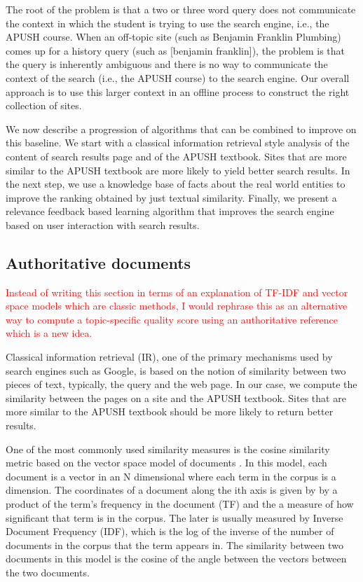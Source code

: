 \documentclass{acm_proc_article-sp}
\begin{document}
The root of the problem is that a two or three word query does not communicate
the context in which the student is trying to use the search engine, i.e., the
APUSH course.  When an off-topic site (such as Benjamin Franklin Plumbing) comes
up for a history query (such as [benjamin franklin]), the problem is that the
query is inherently ambiguous and there is no way to communicate the context of
the search (i.e., the APUSH course) to the search engine.  Our overall approach
is to use this larger context in an offline process to construct the right
collection of sites. 

We now describe a progression of algorithms that can be combined to improve on
this baseline. We start with a classical information retrieval style analysis of
the content of search results page and of the APUSH textbook. Sites that are
more similar to the APUSH textbook are more likely to yield better search
results. In the next step, we use a knowledge base of facts about the real world
entities to improve the ranking obtained by just textual similarity. Finally, we
present a relevance feedback based learning algorithm that improves the search
engine based on user interaction with search results. 

\subsection{Authoritative documents}

\textcolor{red}{Instead of writing this section in terms of an explanation of
  TF-IDF and vector space models which are classic methods, I would rephrase this
  as an alternative way to compute a topic-specific quality score using an
  authoritative reference which is a new idea.}

Classical information retrieval (IR), one of the primary mechanisms used by
search engines such as Google, is based on the notion of similarity between two
pieces of text, typically, the query and the web page.  In our case, we compute
the similarity between the pages on a site and the APUSH textbook. Sites that
are more similar to the APUSH textbook should  be more likely to return better
results. 

One of the most commonly used similarity measures is the cosine similarity
metric based on the vector space model of documents \cite{salton1975vector}. In
this model, each document is a vector in an N dimensional where each term in the
corpus is a dimension. The coordinates of a document along the ith axis is given by by a
product of the term's frequency in the document (TF) and the a measure of how
significant that term is in the corpus. The later is usually measured by Inverse
Document Frequency (IDF), which is the log of the inverse of the number of
documents in the corpus that the term appears in. The similarity between two
documents in this model is the cosine of the angle between the vectors between
the two documents. 
\end{document}
